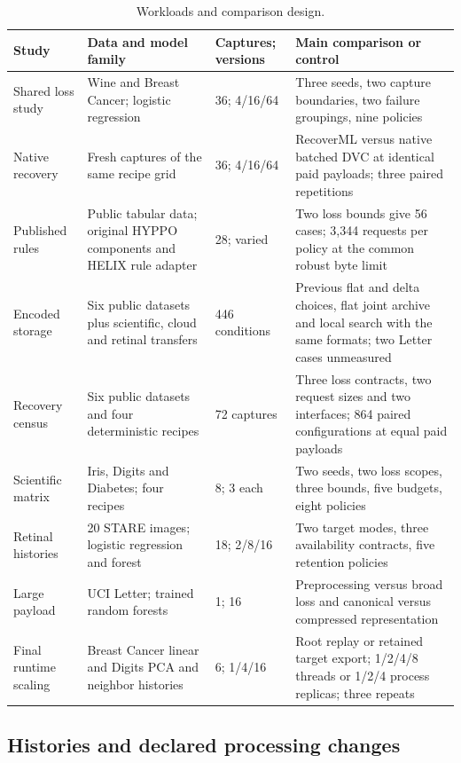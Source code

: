 \begin{table}[t]
\caption{Workloads and comparison design.}
\label{tab:workloads}
\centering\small
\begin{tabular}{p{}p{}p{}p{}}
\toprule
Study & Data and model family & Captures; versions & Main comparison or control\\
\midrule
Shared loss study & Wine and Breast Cancer; logistic regression & 36; 4/16/64 & Three seeds, two capture boundaries, two failure groupings, nine policies\\
Native recovery & Fresh captures of the same recipe grid & 36; 4/16/64 & RecoverML versus native batched DVC at identical paid payloads; three paired repetitions\\
Published rules & Public tabular data; original HYPPO components and HELIX rule adapter & 28; varied & Two loss bounds give 56 cases; 3,344 requests per policy at the common robust byte limit\\
Encoded storage & Six public datasets plus scientific, cloud and retinal transfers & 446 conditions & Previous flat and delta choices, flat joint archive and local search with the same formats; two Letter cases unmeasured\\
Recovery census & Six public datasets and four deterministic recipes & 72 captures & Three loss contracts, two request sizes and two interfaces; 864 paired configurations at equal paid payloads\\
Scientific matrix & Iris, Digits and Diabetes; four recipes & 8; 3 each & Two seeds, two loss scopes, three bounds, five budgets, eight policies\\
Retinal histories & 20 STARE images; logistic regression and forest & 18; 2/8/16 & Two target modes, three availability contracts, five retention policies\\
Large payload & UCI Letter; trained random forests & 1; 16 & Preprocessing versus broad loss and canonical versus compressed representation\\
Final runtime scaling & Breast Cancer linear and Digits PCA and neighbor histories & 6; 1/4/16 & Root replay or retained target export; 1/2/4/8 threads or 1/2/4 process replicas; three repeats\\
\bottomrule
\end{tabular}
\end{table}

\subsection{Histories and declared processing changes}

